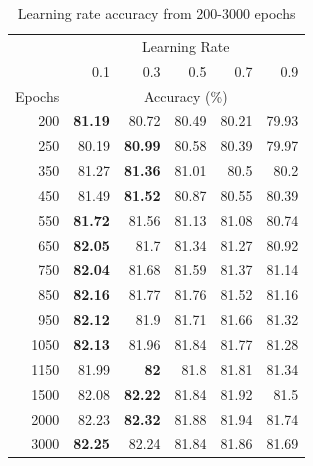 \documentclass[12pt]{article}
\begin{document}
\begin{table}[htbp]
  \centering
  \caption{Learning rate accuracy from 200-3000 epochs}
    \begin{tabular}{r|rrrrr}
    \toprule
    \multicolumn{1}{r}{} & \multicolumn{5}{|c}{Learning Rate} \\
    & 0.1   & 0.3   & 0.5   & 0.7   & 0.9 \\
    \midrule
        Epochs & \multicolumn{5}{|c}{Accuracy (\%)} \\
    \midrule
    200   & \textbf{81.19} & 80.72 & 80.49 & 80.21 & 79.93 \\
    250   & 80.19 & \textbf{80.99} & 80.58 & 80.39 & 79.97 \\
    350   & 81.27 & \textbf{81.36} & 81.01 & 80.5  & 80.2 \\
    450   & 81.49 & \textbf{81.52} & 80.87 & 80.55 & 80.39 \\
    550   & \textbf{81.72} & 81.56 & 81.13 & 81.08 & 80.74 \\
    650   & \textbf{82.05} & 81.7  & 81.34 & 81.27 & 80.92 \\
    750   & \textbf{82.04} & 81.68 & 81.59 & 81.37 & 81.14 \\
    850   & \textbf{82.16} & 81.77 & 81.76 & 81.52 & 81.16 \\
    950   & \textbf{82.12} & 81.9  & 81.71 & 81.66 & 81.32 \\
    1050  & \textbf{82.13} & 81.96 & 81.84 & 81.77 & 81.28 \\
    1150  & 81.99 & \textbf{82} & 81.8  & 81.81 & 81.34 \\
    1500  & 82.08 & \textbf{82.22} & 81.84 & 81.92 & 81.5 \\
    2000  & 82.23 & \textbf{82.32} & 81.88 & 81.94 & 81.74 \\
    3000  & \textbf{82.25} & 82.24 & 81.84 & 81.86 & 81.69 \\
    \bottomrule
    \end{tabular}%
  \label{tab:addlabel}%
\end{table}%
\end{document}
